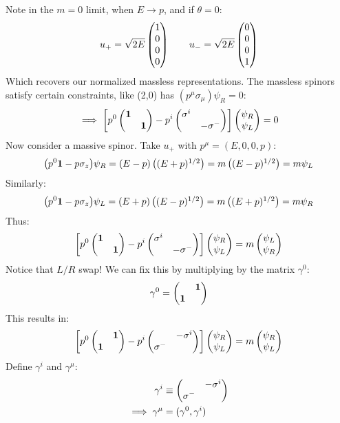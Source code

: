 Note in the $m=0$ limit, when $E\to p$, and if $\theta=0$:
\begin{align*}
  u_+=\sqrt{2E}\pmqty{1\\0\\0\\0}\qquad
  u_-=\sqrt{2E}\pmqty{0\\0\\0\\1}
\end{align*}
Which recovers our normalized massless representations. The massless spinors satisfy certain constraints, like (2,0) has $(p^\mu\sigma_\mu)\psi_R=0$:
\begin{align*}
  \implies\qty[p^0\pmqty{\bm{1}\\&\bm{1}}-p^i\pmqty{\sigma^i\\&-\sigma^-}]
  \pmqty{\psi_R\\\psi_L}=0
\end{align*}
Now consider a massive spinor. Take $u_+$ with $p^\mu=(E,0,0,p)$:
\begin{align*}
  \qty(p^0\bm{1}-p\sigma_z)\psi_R=(E-p)\pmqty{(E+p)^{1/2}}=m\pmqty{(E-p)^{1/2}}
  =m\psi_L
\end{align*}
Similarly:
\begin{align*}
  \qty(p^0\bm{1}-p\sigma_z)\psi_L=(E+p)\pmqty{(E-p)^{1/2}}=m\pmqty{(E+p)^{1/2}}
  =m\psi_R
\end{align*}
Thus:
\begin{align*}
  \qty[p^0\pmqty{\bm{1}\\&\bm{1}}-p^i\pmqty{\sigma^i\\&-\sigma^-}]
  \pmqty{\psi_R\\\psi_L}=m\pmqty{\psi_L\\\psi_R}
\end{align*}
Notice that $L/R$ swap! We can fix this by multiplying by the matrix $\gamma^0$:
\begin{align*}
  \gamma^0=\pmqty{&\bm{1}\\\bm{1}}
\end{align*}
This results in:
\begin{align*}
  \qty[p^0\pmqty{&\bm{1}\\\bm{1}}-p^i\pmqty{&-\sigma^i\\\sigma^-}]
  \pmqty{\psi_R\\\psi_L}=m\pmqty{\psi_R\\\psi_L}
\end{align*}
Define $\gamma^i$ and $\gamma^\mu$:
\begin{align*}
  \gamma^i&\equiv\pmqty{&-\sigma^i\\\sigma^-}\\
  \implies\gamma^\mu&=(\gamma^0,\gamma^i)
\end{align*}

